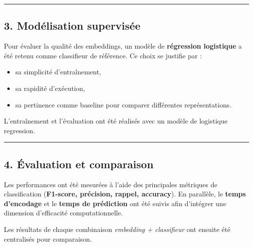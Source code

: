 \documentclass[
  french,
  letterpaper,
  DIV=11,
  numbers=noendperiod]{scrartcl}
\providecommand{\tightlist}{%
  \setlength{\itemsep}{0pt}\setlength{\parskip}{0pt}}
\begin{document}
\begin{center}\rule{0.5\linewidth}{0.5pt}\end{center}

\subsection{3. Modélisation
supervisée}\label{moduxe9lisation-supervisuxe9e}

Pour évaluer la qualité des embeddings, un modèle de \textbf{régression
logistique} a été retenu comme classifieur de référence. Ce choix se
justifie par :

\begin{itemize}
\tightlist
\item
  sa simplicité d'entraînement,
\item
  sa rapidité d'exécution,
\item
  sa pertinence comme baseline pour comparer différentes
  représentations.
\end{itemize}

L'entraînement et l'évaluation ont été réalisés avec un modèle de
logistique regression.

\begin{center}\rule{0.5\linewidth}{0.5pt}\end{center}

\subsection{4. Évaluation et
comparaison}\label{uxe9valuation-et-comparaison}

Les performances ont été mesurées à l'aide des principales métriques de
classification (\textbf{F1-score, précision, rappel, accuracy}). En
parallèle, le \textbf{temps d'encodage} et le \textbf{temps de
prédiction} ont été suivis afin d'intégrer une dimension d'efficacité
computationnelle.

Les résultats de chaque combinaison \emph{embedding + classifieur} ont
ensuite été centralisés pour comparaison.
\end{document}
